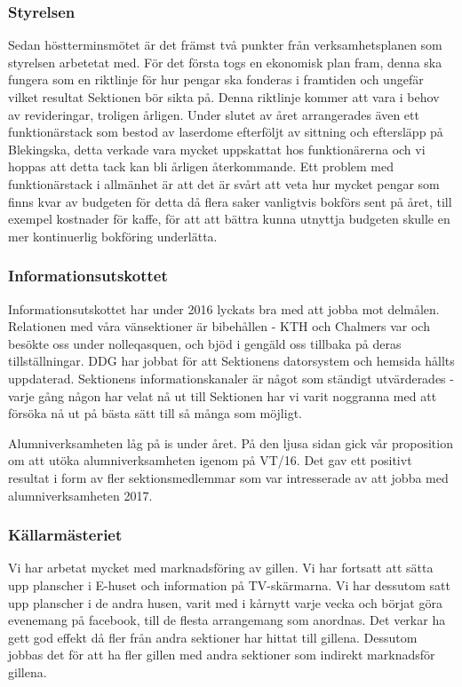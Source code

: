 \documentclass[../_main/handlingar.tex]{subfiles}
\begin{document}

\subsubsection*{Styrelsen}
Sedan höstterminsmötet är det främst två punkter från verksamhetsplanen som styrelsen arbetetat med. För det första togs en ekonomisk plan fram, denna ska fungera som en riktlinje för hur pengar ska fonderas i framtiden och ungefär vilket resultat Sektionen bör sikta på. Denna riktlinje kommer att vara i behov av revideringar, troligen årligen. Under slutet av året arrangerades även ett funktionärstack som bestod av laserdome efterföljt av sittning och eftersläpp på Blekingska, detta verkade vara mycket uppskattat hos funktionärerna och vi hoppas att detta tack kan bli årligen återkommande. Ett problem med funktionärstack i allmänhet är att det är svårt att veta hur mycket pengar som finns kvar av budgeten för detta då flera saker vanligtvis bokförs sent på året, till exempel kostnader för kaffe, för att att bättra kunna utnyttja budgeten skulle en mer kontinuerlig bokföring underlätta.

\subsubsection*{Informationsutskottet}
Informationsutskottet har under 2016 lyckats bra med att jobba mot delmålen. Relationen med våra vänsektioner är bibehållen - KTH och Chalmers var och besökte oss under nolleqasquen, och bjöd i gengäld oss tillbaka på deras tillställningar. DDG har jobbat för att Sektionens datorsystem och hemsida hållts uppdaterad. Sektionens informationskanaler är något som ständigt utvärderades - varje gång någon har velat nå ut till Sektionen har vi varit noggranna med att försöka nå ut på bästa sätt till så många som möjligt.

Alumniverksamheten låg på is under året. På den ljusa sidan gick vår proposition om att utöka alumniverksamheten igenom på VT/16. Det gav ett positivt resultat i form av fler sektionsmedlemmar som var intresserade av att jobba med alumniverksamheten 2017.


\subsubsection*{Källarmästeriet}
Vi har arbetat mycket med marknadsföring av gillen. Vi har fortsatt att sätta upp planscher i E-huset och information på TV-skärmarna. Vi har dessutom satt upp planscher i de andra husen, varit med i kårnytt varje vecka och börjat göra evenemang på facebook, till de flesta arrangemang som anordnas. Det verkar ha gett god effekt då fler från andra sektioner har hittat till gillena. Dessutom jobbas det för att ha fler gillen med andra sektioner som indirekt marknadsför gillena.
\end{document}
